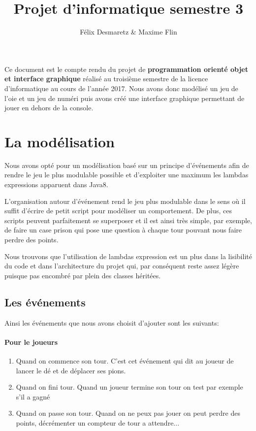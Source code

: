 \documentclass{article}
\title{Projet d'informatique semestre 3}
\author{Félix Desmaretz \& Maxime Flin}
\date{}
\begin{document}
\maketitle

Ce document est le compte rendu du projet de \textbf{programmation orienté objet et interface graphique} réalisé au troisième semestre de la licence d'informatique au cours de l'année 2017. Nous avons donc modélisé un jeu de l'oie et un jeu de numéri puis avons créé une interface graphique permettant de jouer en dehors de la console.
\tableofcontents
\newpage

\section{La modélisation}
Nous avons opté pour un modélisation basé sur un principe d'événements afin de rendre le jeu le plus modulable possible et d'exploiter une maximum les lambdas expressions apparuent dans Java8. 

L'organisation autour d'événement rend le jeu plus modulable dans le sens où il suffit d'écrire de petit script pour modéliser un comportement. De plus, ces scripts peuvent parfaitement se superposer et il est ainsi très simple, par exemple, de faire un case prison qui pose une question à chaque tour pouvant nous faire perdre des points.

Nous trouvons que l'utilisation de lambdas expression est un plus dans la lisibilité du code et dans l'architecture du projet qui, par conséquent reste assez légère puisque pas encombré par plein des classes héritées.

\subsection{Les événements}

Ainsi les événements que nous avons choisit d'ajouter sont les suivants:
\paragraph{Pour le joueurs}
\begin{enumerate}
\item Quand on commence son tour. C'est cet événement qui dit au joueur de lancer le dé et de déplacer ses pions.
\item Quand on fini tour. Quand un joueur termine son tour on test par exemple s'il a gagné
\item Quand on passe son tour. Quand on ne peux pas jouer on peut perdre des points, décrémenter un compteur de tour a attendre...
\end{enumerate}
\end{document}
